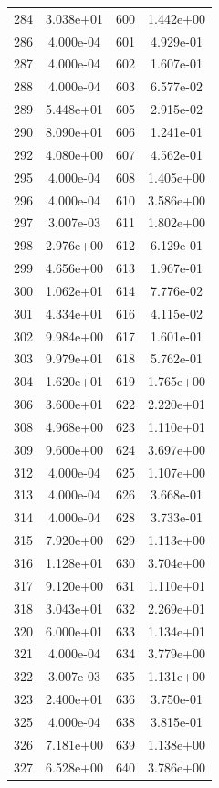 \documentclass[12pt]{article}
\begin{document}
\begin{longtable}{@{}cccc@{}}
284 & 3.038e+01 & 600 & 1.442e+00 \\
286 & 4.000e-04 & 601 & 4.929e-01 \\
287 & 4.000e-04 & 602 & 1.607e-01 \\
288 & 4.000e-04 & 603 & 6.577e-02 \\
289 & 5.448e+01 & 605 & 2.915e-02 \\
290 & 8.090e+01 & 606 & 1.241e-01 \\
292 & 4.080e+00 & 607 & 4.562e-01 \\
295 & 4.000e-04 & 608 & 1.405e+00 \\
296 & 4.000e-04 & 610 & 3.586e+00 \\
297 & 3.007e-03 & 611 & 1.802e+00 \\
298 & 2.976e+00 & 612 & 6.129e-01 \\
299 & 4.656e+00 & 613 & 1.967e-01 \\
300 & 1.062e+01 & 614 & 7.776e-02 \\
301 & 4.334e+01 & 616 & 4.115e-02 \\
302 & 9.984e+00 & 617 & 1.601e-01 \\
303 & 9.979e+01 & 618 & 5.762e-01 \\
304 & 1.620e+01 & 619 & 1.765e+00 \\
306 & 3.600e+01 & 622 & 2.220e+01 \\
308 & 4.968e+00 & 623 & 1.110e+01 \\
309 & 9.600e+00 & 624 & 3.697e+00 \\
312 & 4.000e-04 & 625 & 1.107e+00 \\
313 & 4.000e-04 & 626 & 3.668e-01 \\
314 & 4.000e-04 & 628 & 3.733e-01 \\
315 & 7.920e+00 & 629 & 1.113e+00 \\
316 & 1.128e+01 & 630 & 3.704e+00 \\
317 & 9.120e+00 & 631 & 1.110e+01 \\
318 & 3.043e+01 & 632 & 2.269e+01 \\
320 & 6.000e+01 & 633 & 1.134e+01 \\
321 & 4.000e-04 & 634 & 3.779e+00 \\
322 & 3.007e-03 & 635 & 1.131e+00 \\
323 & 2.400e+01 & 636 & 3.750e-01 \\
325 & 4.000e-04 & 638 & 3.815e-01 \\
326 & 7.181e+00 & 639 & 1.138e+00 \\
327 & 6.528e+00 & 640 & 3.786e+00 \\

\end{longtable}
\end{document}
